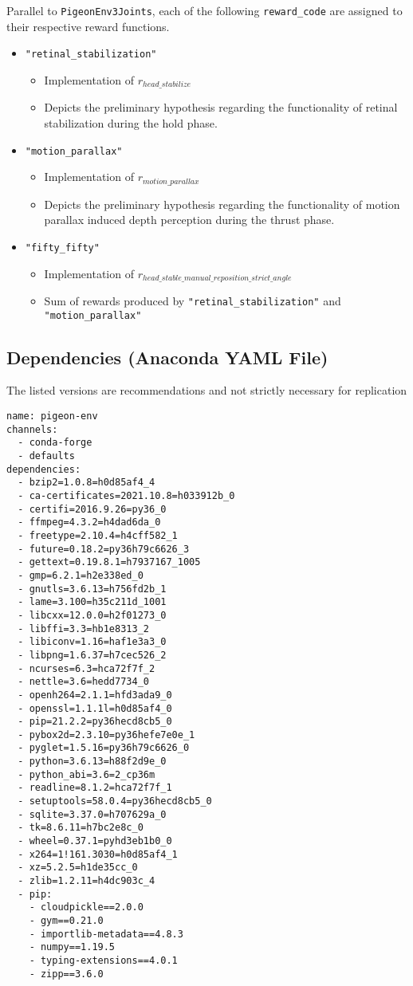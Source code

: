 Parallel to \lstinline|PigeonEnv3Joints|, each of the following \lstinline|reward_code| are assigned to their respective reward functions.
\begin{itemize}
  \item \lstinline|"retinal_stabilization"|
      \begin{itemize}
          \item Implementation of $r_{head\_stabilize}$
          \item Depicts the preliminary hypothesis regarding the functionality of retinal stabilization during the hold phase.
      \end{itemize}
  \item \lstinline|"motion_parallax"|
      \begin{itemize}
          \item Implementation of $r_{motion\_parallax}$
          \item Depicts the preliminary hypothesis regarding the functionality of motion parallax induced depth perception during the thrust phase.
      \end{itemize}
  \item \lstinline|"fifty_fifty"|
      \begin{itemize}
          \item Implementation of $r_{head\_stable\_manual\_reposition\_strict\_angle}$
          \item Sum of rewards produced by  \lstinline|"retinal_stabilization"| and \lstinline|"motion_parallax"|
      \end{itemize}
\end{itemize}

\subsection{Dependencies (Anaconda YAML File)}
The listed versions are recommendations and not strictly necessary for replication
\begin{lstlisting}
name: pigeon-env
channels:
  - conda-forge
  - defaults
dependencies:
  - bzip2=1.0.8=h0d85af4_4
  - ca-certificates=2021.10.8=h033912b_0
  - certifi=2016.9.26=py36_0
  - ffmpeg=4.3.2=h4dad6da_0
  - freetype=2.10.4=h4cff582_1
  - future=0.18.2=py36h79c6626_3
  - gettext=0.19.8.1=h7937167_1005
  - gmp=6.2.1=h2e338ed_0
  - gnutls=3.6.13=h756fd2b_1
  - lame=3.100=h35c211d_1001
  - libcxx=12.0.0=h2f01273_0
  - libffi=3.3=hb1e8313_2
  - libiconv=1.16=haf1e3a3_0
  - libpng=1.6.37=h7cec526_2
  - ncurses=6.3=hca72f7f_2
  - nettle=3.6=hedd7734_0
  - openh264=2.1.1=hfd3ada9_0
  - openssl=1.1.1l=h0d85af4_0
  - pip=21.2.2=py36hecd8cb5_0
  - pybox2d=2.3.10=py36hefe7e0e_1
  - pyglet=1.5.16=py36h79c6626_0
  - python=3.6.13=h88f2d9e_0
  - python_abi=3.6=2_cp36m
  - readline=8.1.2=hca72f7f_1
  - setuptools=58.0.4=py36hecd8cb5_0
  - sqlite=3.37.0=h707629a_0
  - tk=8.6.11=h7bc2e8c_0
  - wheel=0.37.1=pyhd3eb1b0_0
  - x264=1!161.3030=h0d85af4_1
  - xz=5.2.5=h1de35cc_0
  - zlib=1.2.11=h4dc903c_4
  - pip:
    - cloudpickle==2.0.0
    - gym==0.21.0
    - importlib-metadata==4.8.3
    - numpy==1.19.5
    - typing-extensions==4.0.1
    - zipp==3.6.0
\end{lstlisting}
